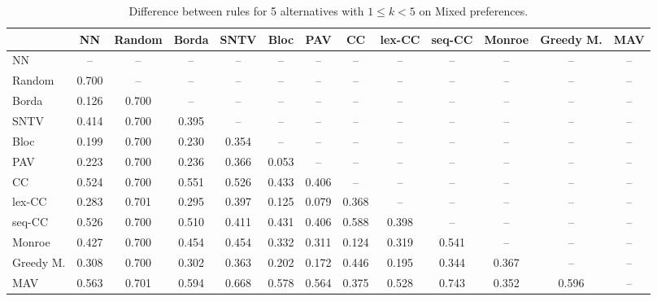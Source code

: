 
\begin{table*}[h!]
\centering
\begin{tabular}{lcccccccccccc}
\toprule
 & NN & Random & Borda & SNTV & Bloc & PAV & CC & lex-CC & seq-CC & Monroe & Greedy M. & MAV \\
\midrule
NN & -- & -- & -- & -- & -- & -- & -- & -- & -- & -- & -- & -- \\
Random & 0.700 & -- & -- & -- & -- & -- & -- & -- & -- & -- & -- & -- \\
Borda & 0.126 & 0.700 & -- & -- & -- & -- & -- & -- & -- & -- & -- & -- \\
SNTV & 0.414 & 0.700 & 0.395 & -- & -- & -- & -- & -- & -- & -- & -- & -- \\
Bloc & 0.199 & 0.700 & 0.230 & 0.354 & -- & -- & -- & -- & -- & -- & -- & -- \\
PAV & 0.223 & 0.700 & 0.236 & 0.366 & 0.053 & -- & -- & -- & -- & -- & -- & -- \\
CC & 0.524 & 0.700 & 0.551 & 0.526 & 0.433 & 0.406 & -- & -- & -- & -- & -- & -- \\
lex-CC & 0.283 & 0.701 & 0.295 & 0.397 & 0.125 & 0.079 & 0.368 & -- & -- & -- & -- & -- \\
seq-CC & 0.526 & 0.700 & 0.510 & 0.411 & 0.431 & 0.406 & 0.588 & 0.398 & -- & -- & -- & -- \\
Monroe & 0.427 & 0.700 & 0.454 & 0.454 & 0.332 & 0.311 & 0.124 & 0.319 & 0.541 & -- & -- & -- \\
Greedy M. & 0.308 & 0.700 & 0.302 & 0.363 & 0.202 & 0.172 & 0.446 & 0.195 & 0.344 & 0.367 & -- & -- \\
MAV & 0.563 & 0.701 & 0.594 & 0.668 & 0.578 & 0.564 & 0.375 & 0.528 & 0.743 & 0.352 & 0.596 & -- \\
\bottomrule
\end{tabular}

\caption{Difference between rules for 5 alternatives with $1 \leq k < 5$ on Mixed preferences.}
\end{table*}
